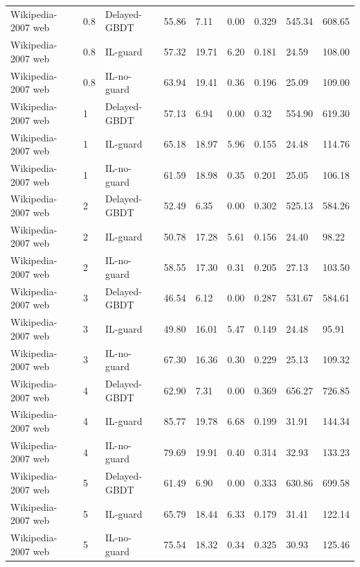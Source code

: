 \begin{table}[t]
\begin{tabular}{lllllllll}
Wikipedia-2007 web & 0.8 & Delayed-GBDT & 55.86 & 7.11 & 0.00 & 0.329 & 545.34 & 608.65 \\
Wikipedia-2007 web & 0.8 & IL-guard & 57.32 & 19.71 & 6.20 & 0.181 & 24.59 & 108.00 \\
Wikipedia-2007 web & 0.8 & IL-no-guard & 63.94 & 19.41 & 0.36 & 0.196 & 25.09 & 109.00 \\
Wikipedia-2007 web & 1 & Delayed-GBDT & 57.13 & 6.94 & 0.00 & 0.32 & 554.90 & 619.30 \\
Wikipedia-2007 web & 1 & IL-guard & 65.18 & 18.97 & 5.96 & 0.155 & 24.48 & 114.76 \\
Wikipedia-2007 web & 1 & IL-no-guard & 61.59 & 18.98 & 0.35 & 0.201 & 25.05 & 106.18 \\
Wikipedia-2007 web & 2 & Delayed-GBDT & 52.49 & 6.35 & 0.00 & 0.302 & 525.13 & 584.26 \\
Wikipedia-2007 web & 2 & IL-guard & 50.78 & 17.28 & 5.61 & 0.156 & 24.40 & 98.22 \\
Wikipedia-2007 web & 2 & IL-no-guard & 58.55 & 17.30 & 0.31 & 0.205 & 27.13 & 103.50 \\
Wikipedia-2007 web & 3 & Delayed-GBDT & 46.54 & 6.12 & 0.00 & 0.287 & 531.67 & 584.61 \\
Wikipedia-2007 web & 3 & IL-guard & 49.80 & 16.01 & 5.47 & 0.149 & 24.48 & 95.91 \\
Wikipedia-2007 web & 3 & IL-no-guard & 67.30 & 16.36 & 0.30 & 0.229 & 25.13 & 109.32 \\
Wikipedia-2007 web & 4 & Delayed-GBDT & 62.90 & 7.31 & 0.00 & 0.369 & 656.27 & 726.85 \\
Wikipedia-2007 web & 4 & IL-guard & 85.77 & 19.78 & 6.68 & 0.199 & 31.91 & 144.34 \\
Wikipedia-2007 web & 4 & IL-no-guard & 79.69 & 19.91 & 0.40 & 0.314 & 32.93 & 133.23 \\
Wikipedia-2007 web & 5 & Delayed-GBDT & 61.49 & 6.90 & 0.00 & 0.333 & 630.86 & 699.58 \\
Wikipedia-2007 web & 5 & IL-guard & 65.79 & 18.44 & 6.33 & 0.179 & 31.41 & 122.14 \\
Wikipedia-2007 web & 5 & IL-no-guard & 75.54 & 18.32 & 0.34 & 0.325 & 30.93 & 125.46 \\
\bottomrule
\end{tabular}
\end{table}
